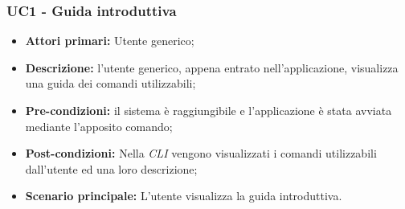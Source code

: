 \subsubsection{UC1 - Guida introduttiva}
\begin{itemize}
	\item \textbf{Attori primari:} Utente generico;
	\item \textbf{Descrizione:} l'utente generico, appena entrato nell'applicazione, visualizza una guida dei comandi utilizzabili; 
	\item \textbf{Pre-condizioni:} il sistema è raggiungibile e l'applicazione è stata avviata mediante l'apposito comando;
	\item \textbf{Post-condizioni:} Nella \textit{CLI\glo} vengono visualizzati i comandi utilizzabili dall'utente ed una loro descrizione;
	\item \textbf{Scenario principale:} L'utente visualizza la guida introduttiva.
\end{itemize}